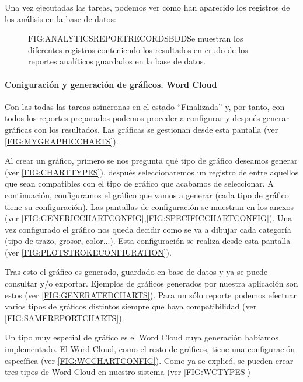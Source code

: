  Una vez ejecutadas las tareas, podemos ver como han aparecido los registros de los análisis en la base de datos:
 
  \begin{figure}[Registros de los reportes analíticos en base de datos]{FIG:ANALYTICSREPORTRECORDSBDD}{Se muestran los diferentes registros conteniendo los resultados en crudo de los reportes analíticos guardados en la base de datos.}
	 \quad
	 \quad
	 \quad
 \end{figure}
 
\paragraph{Coniguración y generación de gráficos. Word Cloud}
Con las todas las tareas asíncronas en el estado ``Finalizada'' y, por tanto, con todos los reportes preparados podemos proceder a configurar y después generar gráficas con los resultados. Las gráficas se gestionan desde esta pantalla (ver \ref{FIG:MYGRAPHICCHARTS}). 

Al crear un gráfico, primero se nos pregunta qué tipo de gráfico deseamos generar (ver \ref{FIG:CHARTTYPES}), después seleccionaremos un registro de entre aquellos que sean compatibles con el tipo de gráfico que acabamos de seleccionar. A continuación, configuramos el gráfico que vamos a generar (cada tipo de gráfico tiene su configuración). Las pantallas de configuración se muestran en los anexos (ver \ref{FIG:GENERICCHARTCONFIG},\ref{FIG:SPECIFICCHARTCONFIG}). Una vez configurado el gráfico nos queda decidir como se va a dibujar cada categoría (tipo de trazo, grosor, color...). Esta configuración se realiza desde esta pantalla (ver \ref{FIG:PLOTSTROKECONFIURATION}).

Tras esto el gráfico es generado, guardado en base de datos y ya se puede consultar y/o exportar. Ejemplos de gráficos generados por nuestra aplicación son estos (ver \ref{FIG:GENERATEDCHARTS}). Para un sólo reporte podemos efectuar varios tipos de gráficos distintos siempre que haya compatibilidad (ver \ref{FIG:SAMEREPORTCHARTS}).

Un tipo muy especial de gráfico es el Word Cloud cuya generación habíamos implementado. El Word Cloud, como el resto de gráficos, tiene una configuración específica (ver \ref{FIG:WCCHARTCONFIG}). Como ya se explicó, se pueden crear tres tipos de Word Cloud en nuestro sistema (ver \ref{FIG:WCTYPES})

